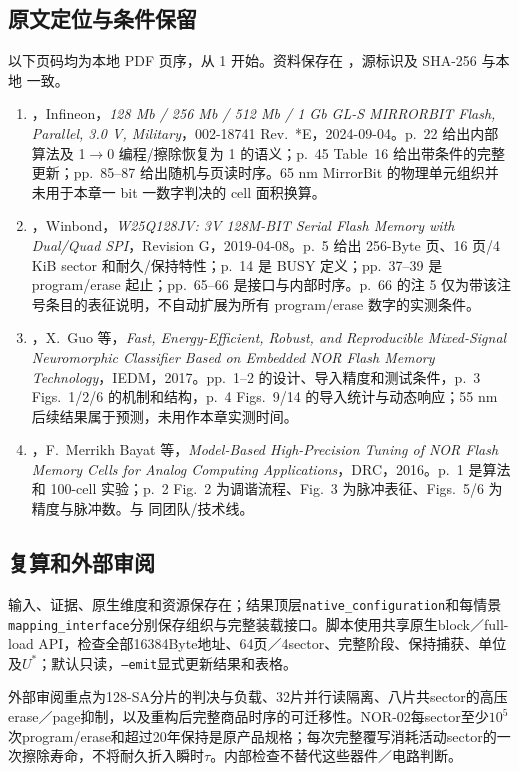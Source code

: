\subsection{原文定位与条件保留}
以下页码均为本地 PDF 页序，从 1 开始。资料保存在 ，源标识及 SHA-256 与本地  一致。
\begin{enumerate}
\item {}，Infineon，\emph{128 Mb / 256 Mb / 512 Mb / 1 Gb GL-S MIRRORBIT Flash, Parallel, 3.0 V, Military}，002-18741 Rev.~*E，2024-09-04。p.~22 给出内部算法及 1$\to$0 编程/擦除恢复为 1 的语义；p.~45 Table~16 给出带条件的完整更新；pp.~85--87 给出随机与页读时序。65 nm MirrorBit 的物理单元组织并未用于本章一 bit 一数字判决的 cell 面积换算。
\item {}，Winbond，\emph{W25Q128JV: 3V 128M-BIT Serial Flash Memory with Dual/Quad SPI}，Revision G，2019-04-08。p.~5 给出 256-Byte 页、16 页/4 KiB sector 和耐久/保持特性；p.~14 是 BUSY 定义；pp.~37--39 是 program/erase 起止；pp.~65--66 是接口与内部时序。p.~66 的注 5 仅为带该注号条目的表征说明，不自动扩展为所有 program/erase 数字的实测条件。
\item {}，X.~Guo 等，\emph{Fast, Energy-Efficient, Robust, and Reproducible Mixed-Signal Neuromorphic Classifier Based on Embedded NOR Flash Memory Technology}，IEDM，2017。pp.~1--2 的设计、导入精度和测试条件，p.~3 Figs.~1/2/6 的机制和结构，p.~4 Figs.~9/14 的导入统计与动态响应；55 nm 后续结果属于预测，未用作本章实测时间。
\item {}，F.~Merrikh Bayat 等，\emph{Model-Based High-Precision Tuning of NOR Flash Memory Cells for Analog Computing Applications}，DRC，2016。p.~1 是算法和 100-cell 实验；p.~2 Fig.~2 为调谐流程、Fig.~3 为脉冲表征、Figs.~5/6 为精度与脉冲数。与  同团队/技术线。
\end{enumerate}


\subsection{复算和外部审阅}
输入、证据、原生维度和资源保存在；结果顶层\texttt{native\_configuration}和每情景\texttt{mapping\_interface}分别保存组织与完整装载接口。脚本使用共享原生block／full-load API，检查全部16384Byte地址、64页／4sector、完整阶段、保持捕获、单位及$U^*$；默认只读，\texttt{--emit}显式更新结果和表格。

外部审阅重点为128-SA分片的判决与负载、32片并行读隔离、八片共sector的高压erase／page抑制，以及重构后完整商品时序的可迁移性。NOR-02每sector至少$10^5$次program/erase和超过20年保持是原产品规格；每次完整覆写消耗活动sector的一次擦除寿命，不将耐久折入瞬时$\tau$。内部检查不替代这些器件／电路判断。

